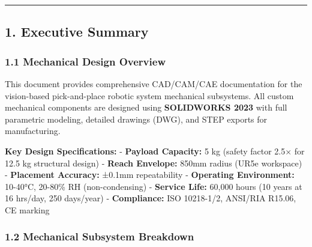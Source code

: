 \documentclass[
]{article}
\begin{document}
\begin{center}\rule{0.5\linewidth}{0.5pt}\end{center}

\hypertarget{executive-summary}{%
\subsection{1. Executive Summary}\label{executive-summary}}

\hypertarget{mechanical-design-overview}{%
\subsubsection{1.1 Mechanical Design
Overview}\label{mechanical-design-overview}}

This document provides comprehensive CAD/CAM/CAE documentation for the
vision-based pick-and-place robotic system mechanical subsystems. All
custom mechanical components are designed using \textbf{SOLIDWORKS 2023}
with full parametric modeling, detailed drawings (DWG), and STEP exports
for manufacturing.

\textbf{Key Design Specifications:} - \textbf{Payload Capacity:} 5 kg
(safety factor 2.5× for 12.5 kg structural design) - \textbf{Reach
Envelope:} 850mm radius (UR5e workspace) - \textbf{Placement Accuracy:}
±0.1mm repeatability - \textbf{Operating Environment:} 10-40°C, 20-80\%
RH (non-condensing) - \textbf{Service Life:} 60,000 hours (10 years at
16 hrs/day, 250 days/year) - \textbf{Compliance:} ISO 10218-1/2,
ANSI/RIA R15.06, CE marking

\hypertarget{mechanical-subsystem-breakdown}{%
\subsubsection{1.2 Mechanical Subsystem
Breakdown}\label{mechanical-subsystem-breakdown}}
\end{document}
